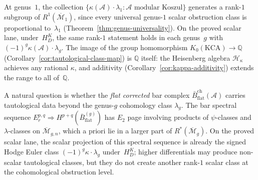 \begin{remark}\label{rem:tautological-span}
At genus~$1$, the collection
$\{\kappa(\mathcal{A}) \cdot \lambda_1 :
\mathcal{A} \text{ modular Koszul}\}$ generates a rank-$1$ subgroup of
$R^1(\overline{\mathcal{M}}_1)$, since every universal genus-$1$
scalar obstruction class is proportional to~$\lambda_1$
(Theorem~\ref{thm:genus-universality}). On the proved scalar lane,
under~$H_D^K$, the same rank-$1$ statement holds in each genus~$g$
with $(-1)^g\kappa(\mathcal{A}) \cdot \lambda_g$. The image of the group
homomorphism $K_0(\mathrm{KCA}) \to \mathbb{Q}$
\textup{(}Corollary~\ref{cor:tautological-class-map}\textup{)} is
$\mathbb{Q}$ itself: the Heisenberg algebra $\mathcal{H}_\kappa$
achieves any rational $\kappa$, and additivity
\textup{(}Corollary~\ref{cor:kappa-additivity}\textup{)} extends the
range to all of~$\mathbb{Q}$.

A natural question is whether the \emph{flat corrected} bar complex
$\bar{B}^{\mathrm{ch}}_{\mathrm{flat}}(\mathcal{A})$ carries tautological data beyond
the genus-$g$ cohomology class $\lambda_g$. The bar spectral sequence
$E_r^{p,q} \Rightarrow
H^{p+q}(\bar{B}^{(g)}_{\mathrm{flat}})$ has $E_2$ page
involving products of $\psi$-classes and $\lambda$-classes on
$\overline{\mathcal{M}}_{g,n}$, which a priori lie in a larger part of
$R^*(\overline{\mathcal{M}}_g)$. On the proved scalar lane, the
scalar projection of this spectral sequence is already the signed
Hodge Euler class $(-1)^g\kappa\cdot\lambda_g$ under~$H_D^K$; higher differentials may produce
non-scalar tautological classes, but they do not create another
rank-$1$ scalar class at the cohomological obstruction level.
\end{remark}


